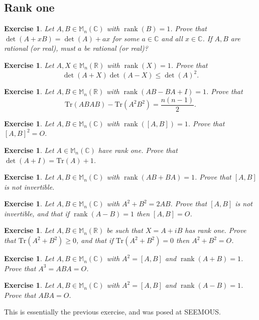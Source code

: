 \documentclass[12pt]{article}
\renewcommand{\Tr}{\mathrm{Tr}}
\DeclareMathOperator{\Rank}{rank}
\theoremstyle{breakplain}
\theoremstyle{breakdef}
\newtheorem{ex}[subsubsection]{Exercise}
\theoremstyle{remark}
\begin{document}
\subsection*{Rank one}
\begin{ex}
    Let $A,B\in \mathbb{M}_n(\mathbb{C})$ with $\Rank(B)=1$. Prove that $\det(A+xB)=\det(A)+ax$ for some $a\in \mathbb{C}$ and all $x\in\mathbb{C}$.
    If $A,B$ are rational (or real), must $a$ be rational (or real)?
\end{ex}
\begin{ex}
    Let $A,X\in \mathbb{M}_n(\mathbb{R})$ with $\Rank(X)=1$. Prove that
    \[\det(A+X)\det(A-X)\leq\det(A)^2.\]
\end{ex}
\begin{ex}
    Let $A,B\in \mathbb{M}_n(\mathbb{R})$ with $\Rank(AB-BA+I)=1$. Prove that
    \[\Tr(ABAB)-\Tr(A^2B^2)=\frac{n(n-1)}{2}.\]
\end{ex}
\begin{ex}
    Let $A,B\in \mathbb{M}_n(\mathbb{C})$ with $\Rank([A,B])=1$. Prove that $[A,B]^2=O$.
\end{ex}
\begin{ex}
    Let $A\in \mathbb{M}_n(\mathbb{C})$ have rank one. Prove that $\det(A+I)=\Tr(A)+1$.
\end{ex}
\begin{ex}
    Let $A,B\in \mathbb{M}_n(\mathbb{C})$ with $\Rank(AB+BA)=1$. Prove that $[A,B]$ is not invertible.
\end{ex}
\begin{ex}
    Let $A,B\in \mathbb{M}_n(\mathbb{C})$ with $A^2+B^2=2AB$. Prove that $[A,B]$ is not invertible, and that if $\Rank(A-B)=1$ then $[A,B]=O$.
\end{ex}
\begin{ex}
    Let $A,B\in \mathbb{M}_n(\mathbb{R})$ be such that $X=A+iB$ has rank one. Prove that $\Tr(A^2+B^2)\geq 0$, and that if $\Tr(A^2+B^2)=  0$ then $A^2+B^2=O$.
\end{ex}
\begin{ex}
    Let $A,B\in \mathbb{M}_n(\mathbb{C})$ with $A^2=[A,B]$ and $\Rank(A+B)=1$. Prove that $A^3=ABA=O$.
\end{ex}
\begin{ex}
    Let $A,B\in \mathbb{M}_n(\mathbb{C})$ with $A^2=[A,B]$ and $\Rank(A-B)=1$. Prove that $ABA=O$.
\end{ex}
This is essentially the previous exercise, and was posed at SEEMOUS.

\newpage
\end{document}
